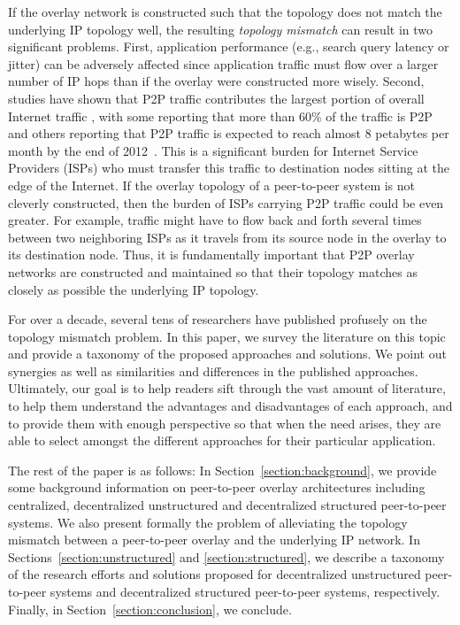 If the overlay network is constructed such that the topology does not match the 
underlying IP topology well, the resulting \emph{topology mismatch} 
can result in
two significant problems.  First, application performance (e.g., search query latency
or jitter) can be adversely affected since application traffic must flow over a larger number
of IP hops than if the overlay were constructed more wisely.  Second, studies have shown
that P2P traffic contributes the largest portion of overall Internet traffic
\cite{seroiu_analysiscds_2002,sen_analyzep2ptraffic_2004,krp_ispfear_2005}, with
some reporting that more than 60\% of the traffic is P2P~\cite{cachelogic,ipoque2007,ipoque2009}  
and others reporting that P2P traffic is expected to reach almost 8 petabytes 
per month by the end of 2012~\cite{multinteligence}.  This is a significant burden for Internet Service Providers (ISPs) who 
must transfer this traffic to destination nodes sitting at the edge of the Internet.
If the overlay topology of a peer-to-peer system is not cleverly constructed, then 
the burden of ISPs carrying P2P traffic could be even greater.
For example, traffic might have to
flow back and forth several times between two neighboring ISPs as it travels from its
source node in the overlay to its destination node.
Thus, it is fundamentally important that P2P overlay networks are constructed
and maintained so that
their topology matches as closely as possible the underlying IP topology. 

For over a decade, several tens of researchers have published profusely on the 
topology mismatch problem.  In this paper, we survey the literature
on this topic and provide a taxonomy of the proposed approaches and solutions.
We point out synergies
as well as similarities and differences in the published approaches.  
Ultimately, our goal is to help readers sift through the vast
amount of literature, to help them understand the advantages and 
disadvantages of each approach, and to provide them with enough 
perspective so that when the need arises, they are able to select 
amongst the different approaches for their 
particular application.

The rest of the paper is as follows:  In Section~\ref{section:background}, 
we provide some background information
on peer-to-peer overlay architectures including centralized, decentralized unstructured
and decentralized structured peer-to-peer systems.  We also present formally the
problem of alleviating the topology mismatch between a peer-to-peer overlay and the
underlying IP network.  In Sections~\ref{section:unstructured} and 
\ref{section:structured}, we describe a taxonomy of
the research efforts and solutions
proposed for decentralized unstructured peer-to-peer systems 
and decentralized
structured peer-to-peer systems, respectively.  Finally, 
in Section~\ref{section:conclusion}, we conclude.


